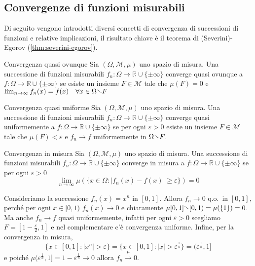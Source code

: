 \subsection{Convergenze di funzioni misurabili}
Di seguito vengono introdotti diversi concetti di convergenza di successioni di funzioni e relative implicazioni, 
il risultato chiave è il teorema di (Severini)-Egorov (\ref{thm:severini-egorov}).
\begin{definition}{Convergenza quasi ovunque}
    Sia \((\Omega, \mathcal{M}, \mu)\) uno spazio di misura. Una successione di
    funzioni misurabili \(f_{n} : \Omega \to \mathbb{R} \cup \{\pm \infty\} \)
    converge quasi ovunque a \(f : \Omega \to \mathbb{R} \cup \{\pm \infty\} \)
    se esiste un insieme \(F \in \mathcal{M}\) tale che \(\mu(F) = 0\) e
    \(\lim_{n \to \infty} f_{n}(x) = f(x) \quad \forall x \in \Omega \sminus F\)
\end{definition}
\begin{definition}{Convergenza quasi uniforme}
    Sia \((\Omega, \mathcal{M}, \mu)\) uno spazio di misura. Una successione di
    funzioni misurabili \(f_{n} : \Omega \to \mathbb{R} \cup \{\pm \infty\} \)
    converge quasi uniformemente a \(f : \Omega \to \mathbb{R} \cup \{\pm \infty\} \)
    se per ogni \(\varepsilon > 0\) esiste un insieme \(F \in \mathcal{M}\) tale
    che \(\mu(F) < \varepsilon\) e \(f_{n} \to f\) uniformemente in \(\Omega
    \sminus F\).
\end{definition}
\begin{definition}{Convergenza in misura}
    Sia \((\Omega, \mathcal{M}, \mu)\) uno spazio di misura. Una successione di
    funzioni misurabili \(f_{n} : \Omega \to \mathbb{R} \cup \{\pm \infty\} \)
    converge in misura a \(f : \Omega \to \mathbb{R} \cup \{\pm \infty\} \) se
    per ogni \(\varepsilon > 0\) 
    \[
        \lim_{n \to \infty} \mu(\{x \in \Omega : |f_{n}(x) - f(x)| \ge
        \varepsilon\}) = 0
    \]
\end{definition}
\begin{example}
    Consideriamo la successione \(f_{n}{(x)} = x^{n}\) in \([0,1]\). Allora
    \(f_{n} \to 0\) q.o.~in \([0, 1]\), perché per ogni \(x \in [0, 1)\)
    \(f_{n}{(x)} \to 0\) e chiaramente \(\mu{[0,1] \sminus {[0,1)}} =
    \mu{(\{1\} )} = 0\). Ma anche \(f_{n} \to f\) quasi uniformemente, infatti
    per ogni \(\varepsilon > 0\) scegliamo \(F=[1-\frac{\varepsilon}{2} , 1]\) e
    nel complementare c'è convergenza uniforme. Infine, per la convergenza in
    misura, \[
        \{x \in [0,1] : |x^{n}| > \varepsilon\} = \{x \in
        [0,1] : |x| > \varepsilon^{\frac{1}{n}}\} = (\varepsilon^{\frac{1}{n}},
        1]
    \]
    e poiché \(\mu{(\varepsilon^{\frac{1}{n}}, 1]} = 1-\varepsilon^{\frac{1}{n}}
    \to 0\) allora \(f_{n} \overset{\mu}{\to} 0\).
\end{example}
